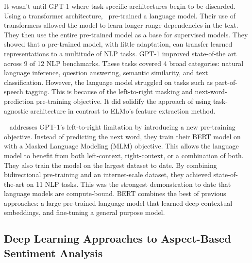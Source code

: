 It wasn’t until GPT-1 where task-specific architectures begin to be discarded.
Using a transformer architecture,~\cite{radford2018improving} pre-trained a language model.
Their use of transformers allowed the model to learn longer range dependencies in the text.
They then use the entire pre-trained model as a base for supervised models.
They showed that a pre-trained model, with little adaptation, can transfer learned representations to a multitude of NLP tasks.
GPT-1 improved state-of-the art across 9 of 12 NLP benchmarks.
These tasks covered 4 broad categories: natural language inference, question answering, semantic similarity, and text classification.
However, the language model struggled on tasks such as part-of-speech tagging.
This is because of the left-to-right masking and next-word-prediction pre-training objective.
It did solidify the approach of using task-agnostic architecture in contrast to ELMo’s feature extraction method.

~\cite{DBLP:journals/corr/abs-1810-04805} addresses GPT-1’s left-to-right limitation by introducing a new pre-training objective.
Instead of predicting the next word, they train their BERT model on with a Masked Language Modeling (MLM) objective.
This allows the language model to benefit from both left-context, right-context, or a combination of both.
They also train the model on the largest dataset to date.
By combining bidirectional pre-training and an internet-scale dataset, they achieved state-of-the-art on 11 NLP tasks.
This was the strongest demonstration to date that language models are compute-bound.
BERT combines the best of previous approaches: a large pre-trained language model that learned deep contextual embeddings, and fine-tuning a general purpose model.





\subsection{Deep Learning Approaches to Aspect-Based Sentiment Analysis}\label{subsec:deep-learning-approaches-to-aspect-based-sentiment-analysis}


